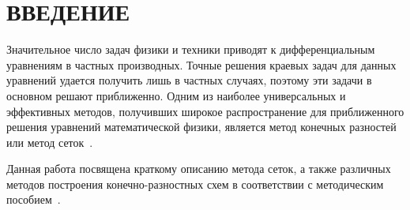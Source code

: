 \section*{ВВЕДЕНИЕ}

Значительное число задач физики и техники приводят к дифференциальным
уравнениям в частных производных.
Точные решения краевых задач для данных уравнений удается получить лишь
в частных случаях, поэтому эти задачи в основном решают приближенно.
Одним из наиболее универсальных и эффективных методов,
получивших широкое распространение для приближенного решения
уравнений математической физики, является метод конечных разностей
или метод сеток~\cite{samarskij1978}.

Данная работа посвящена краткому описанию метода сеток,
а также различных методов построения конечно-разностных схем
в соответствии с методическим пособием~\cite{sinitsyn2007}.